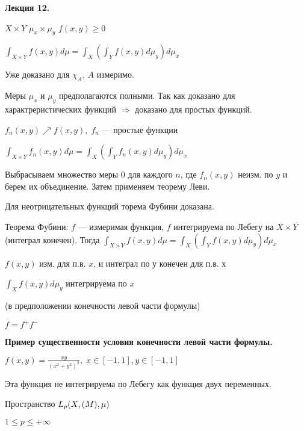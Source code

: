 

\begin{center} \textbf{Лекция 12.} \end{center}

$X \times Y$ $\mu_x \times \mu_y$ $f(x,y) \geqslant 0$

$\int_{X \times Y} f(x,y) d \mu = \int_X (\int_Y f(x,y) d \mu_y) d
\mu_x$

Уже  доказано для $\chi_A$, $A$ измеримо.

Меры $\mu_x$ и $\mu_y$ предполагаются полными. Так как доказано
для характреристических функций $\Rightarrow$ доказано для простых
функций.

%
%
%
%
%
%
%
%
%
%
%

$f_n(x,y) \nearrow f(x,y), \; f_n$ --- простые функции

$\int_{X \times Y} f_n(x,y) d \mu = \int_X (\int_Y f_n (x,y) d
\mu_y) d \mu_x$

Выбрасываем множество меры 0 для каждого $n$, где $f_n(x,y)$
неизм. по $y$ и берем их объединение. Затем применяем теорему
Леви.

Для неотрицательных функций торема Фубини доказана.

Теорема Фубини: $f$ --- измеримая функция, $f$ интегрируема по
Лебегу на $X \times Y$ (интеграл конечен). Тогда $\int_{X \times
Y} f(x,y) d \mu = \int_X(\int_Y f (x,y) d \mu_y) d \mu_x$

$f(x,y)$ изм. для п.в. $x$, и интеграл по у конечен для п.в. х

$\int_X f(x,y) d \mu_y$ интегрируема по $x$

(в предположении конечности левой части формулы)

$f = f^+ f^-$


\textbf{Пример существенности условия конечности левой части
формулы.} \quad

$f(x,y) = \frac{xy}{(x^2 + y^2)^2}, \; x\in [-1, 1], y \in [-1,
1]$

Эта функция не интегрируема по Лебегу как функция двух переменных.

Пространство $L_p (X, \EuScript(M), \mu)$

$1 \leqslant p \leqslant +\infty$

